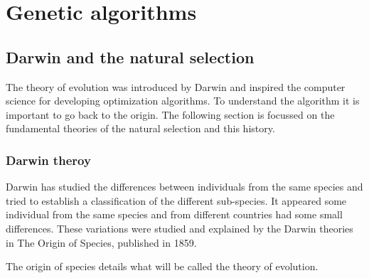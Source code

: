 \chapter{Genetic algorithms }\label{chap:EA}

\minitoc


\section{Darwin and the natural selection }

The theory of evolution was introduced by Darwin and inspired the computer science for developing optimization algorithms. To understand the algorithm it is important to go back to the origin.
The following  section is  focussed on the fundamental theories of the  natural selection and this history. 
\subsection{Darwin theroy } \label{sec:GA}

Darwin has studied the differences between individuals from the same species and tried to establish a classification of the different sub-species. It appeared some individual from the same species and from different countries had some small differences. These variations were studied and explained by the Darwin theories in The Origin of Species, published in 1859. 

The origin of species details what will be called the theory of evolution. 


